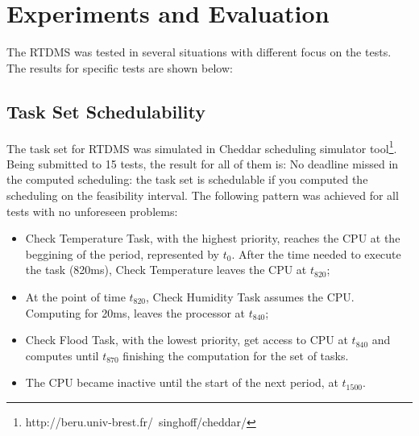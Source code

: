 \documentclass[12pt]{article}
\begin{document}
\iffalse
\subsection{Hardware Requirements}

The prototype implementation of RTDMS consisted in the following hardware equipments:
\begin{itemize}
 \item 1x - Arduino Uno
 \item 3x - Temperature and humidity sensors
 \item 1x - Rain sensor
 \item 1x - Buzzer
 \item 1x - Potentiometer
\end{itemize}


[negocio do arduino]
\fi

\section{Experiments and Evaluation}

The RTDMS was tested in several situations with different focus on the tests. The results for specific tests are shown below:

\subsection{Task Set Schedulability}

The task set for RTDMS was simulated in Cheddar scheduling simulator tool\footnote{http://beru.univ-brest.fr/~singhoff/cheddar/}.
Being submitted to 15 tests, the result for all of them is: No deadline missed in the computed scheduling: the task set is 
schedulable if you computed the scheduling on the feasibility interval. The following pattern was achieved for all tests with 
no unforeseen problems:
\begin{itemize}
 \item Check Temperature Task, with the highest priority, reaches the CPU at the beggining of the period, represented by
\(t_0\). After the time needed to execute the task (820ms), Check Temperature leaves the CPU at \(t_{820}\);
 \item At the point of time \(t_{820}\), Check Humidity Task assumes the CPU. Computing for 20ms, leaves the processor at 
\(t_{840}\);
 \item Check Flood Task, with the lowest priority, get access to CPU at \(t_{840}\) and computes until \(t_{870}\) finishing
the computation for the set of tasks.
 \item The CPU became inactive until the start of the next period, at \(t_{1500}\).
\end{itemize}
\end{document}
